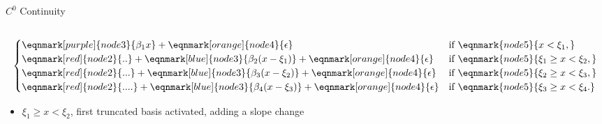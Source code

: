 \documentclass[english]{beamer}
\newcommand{\alertblue}[1]{{\color{blue}#1}}
\begin{document}
\begin{frame}{$C^0$ Continuity}
\begin{columns}
\begin{column}{0.7\textwidth}
{\begin{equation*}
\begin{cases}
                  \eqnmark[purple]{node3}{\beta_1 x} + 
                  \eqnmark[orange]{node4}{\epsilon} & \text{if } 
                  \eqnmark{node5}{x < \xi_1,} \\
                  \eqnmark[red]{node2}{..} + 
                  \eqnmark[blue]{node3}{\beta_2 (x - \xi_1) } +
                  \eqnmark[orange]{node4}{\epsilon} & \text{if } 
                  \eqnmark{node5}{\xi_1 \geq x < \xi_2,} \\
                  \eqnmark[red]{node2}{...} + 
                  \eqnmark[blue]{node3}{\beta_3 (x - \xi_2)} +
                  \eqnmark[orange]{node4}{\epsilon} & \text{if } 
                  \eqnmark{node5}{\xi_2\geq x < \xi_3,} \\
                  \eqnmark[red]{node2}{....} + 
                  \eqnmark[blue]{node3}{\beta_4 (x - \xi_3)} +
                  \eqnmark[orange]{node4}{\epsilon} & \text{if } 
                  \eqnmark{node5}{\xi_3 \geq x < \xi_4.} 
              \end{cases}
          \end{equation*}
          }
          \begin{itemize}
        \item \alertblue{\( \xi_1 \geq x < \xi_2 \)}, first truncated basis \alertblue{activated}, \alert{adding a slope change} 
    \end{itemize} 
        \end{column}
    \end{columns}
\end{frame}
\end{document}
